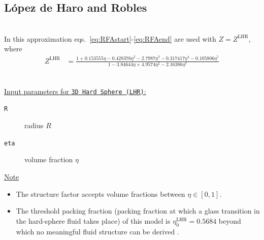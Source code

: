 \clearpage
\subsection{L\'{o}pez de Haro and Robles} \cite{Robles2003} ~\\

\noindent In this approximation eqs.\ \ref{eq:RFAstart}-\ref{eq:RFAend} are used with $Z=Z^\mathrm{LHR}$, where
\begin{align}
Z^\mathrm{LHR} &= \frac{1   + 0.153555\eta
                            - 0.428376\eta^2
                            - 2.7987\eta^3
                            - 0.317417\eta^4
                            - 0.105806\eta^5}{1-3.84644\eta + 4.9574\eta^2 - 2.16386\eta^3}
\end{align}

\vspace{5mm}

\hspace{1pt}\\
\uline{Input parameters for \texttt{3D Hard Sphere (LHR)}:}
\begin{description}
    \item[\texttt{R}]  radius $R$
    \item[\texttt{eta}] volume fraction $\eta$
\end{description}

\noindent
\uline{Note}
\begin{itemize}
\item The structure factor accepts volume fractions between $\eta \in [0,1]$.
\item The threshold packing fraction (packing
fraction at which a glass transition in the hard-sphere fluid takes place) of this model is $\eta^\mathrm{LHR}_0 = 0.5684$  beyond
which no meaningful fluid structure can be derived \cite{Haro2004}.
\end{itemize}

